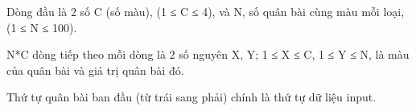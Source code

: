Dòng đầu là 2 số C (số màu), (1 ≤ C ≤ 4), và N, số quân bài cùng màu mỗi loại, (1 ≤ N ≤ 100).  

   N*C dòng tiếp theo mỗi dòng là 2 số nguyên X, Y; 1 ≤ X ≤ C, 1 ≤ Y ≤ N,  là màu của quân bài và giá trị quân bài đó.  

   Thứ tự quân bài ban đầu (từ trái sang phải) chính là thứ tự dữ liệu input.